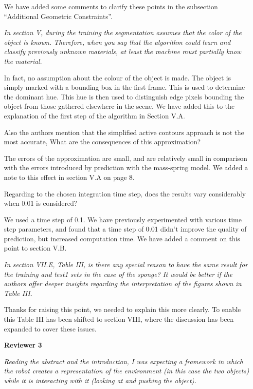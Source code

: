 \documentclass[letterpaper,12pt]{letter}
\begin{document}
We have added some comments to clarify these points in the subsection “Additional Geometric Constraints”.

\emph{In section V, during the training the segmentation assumes that the color of the object is known. Therefore, when you say that the algorithm could learn and classify previously unknown materials, at least the machine must partially know the material.}

In fact, no assumption about the colour of the object is made. The object is simply marked with a bounding box in the first frame. This is used to determine the dominant hue. This hue is then used to distinguish edge pixels bounding the object from those gathered elsewhere in the scene. We have added this to the explanation of the first step of the algorithm in Section V.A.

Also the authors mention that the simplified active contours approach is not the most accurate, What are the consequences of this approximation?

The errors of the approximation are small, and are relatively small in comparison with the errors introduced by prediction with the mass-spring model. We added a note to this effect in section V.A  on page 8.

Regarding to the chosen integration time step, does the results vary considerably when 0.01 is considered?

We used a time step of 0.1. We have previously experimented with various time step parameters, and found that a time step of 0.01 didn’t improve the quality of prediction, but increased computation time.  We have added a comment on this point to section V.B.

\emph{In section VII.E, Table III, is there any special reason to have the same result for the training and test1 sets  in the case of the sponge? It would be better if the authors offer deeper insights regarding the interpretation of the figures shown in Table III.}

Thanks for raising this point, we needed to explain this more clearly.  To enable this Table III has been shifted to section VIII, where the discussion has been expanded to cover these issues.


\textbf{Reviewer 3}

\emph{Reading the abstract and the introduction, I was expecting a framework in which the robot creates a representation of the environment (in this case the two objects) while it is interacting with it (looking at and pushing the object).}
\end{document}
